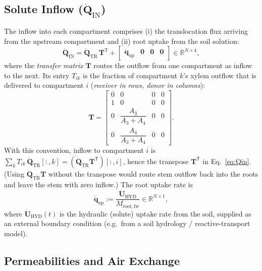 \documentclass[12pt,a4paper]{article}
\newcommand{\R}{\mathbb{R}}
\begin{document}
\subsection{Solute Inflow (\texorpdfstring{$\dot{\mathbf{Q}}_\mathrm{IN}$}{Q\_IN})}\label{sec:inflow}

The inflow into each compartment comprises (i) the translocation flux arriving from the upstream compartment and (ii) root uptake from the soil solution:
\begin{equation}\label{eq:Qin}
    \dot{\mathbf Q}_\mathrm{IN}
=
\dot{\mathbf Q}_\mathrm{TR}\,\mathbf T^{\mathsf T}
+
\begin{bmatrix}
\dot{\mathbf q}_\mathrm{up} & \mathbf 0 & \mathbf 0 & \mathbf 0
\end{bmatrix}
\in \R^{N\times4},
\end{equation}
where the \emph{transfer matrix} $\mathbf{T}$ routes the outflow from one compartment as inflow to the next.  Its entry $T_{ik}$ is the fraction of compartment $k$'s xylem outflow that is delivered to compartment $i$ (\emph{receiver in rows, donor in columns}):
\begin{equation}\label{eq:T}
    \mathbf T
=
\begin{bmatrix}
0 & 0 & 0 & 0 \\[2pt]
1 & 0 & 0 & 0 \\[2pt]
0 & \dfrac{A_3}{A_3 + A_4} & 0 & 0 \\[6pt]
0 & \dfrac{A_4}{A_3 + A_4} & 0 & 0
\end{bmatrix}.
\end{equation}
With this convention, inflow to compartment $i$ is $\sum_k T_{ik}\,\dot{\mathbf Q}_\mathrm{TR}[:,k] = (\dot{\mathbf Q}_\mathrm{TR}\mathbf T^{\mathsf T})[:,i]$, hence the transpose $\mathbf T^{\mathsf T}$ in Eq.~\eqref{eq:Qin}.  (Using $\dot{\mathbf Q}_\mathrm{TR}\mathbf T$ without the transpose would route stem outflow back into the roots and leave the stem with zero inflow.)  The root uptake rate is
\begin{equation*}
    \dot{\mathbf q}_\mathrm{up}
:=
\frac{\dot{\mathbf U}_\mathrm{HYD}}{M_{\mathrm{root,fw}}}
\in \R^{N\times1},
\end{equation*}
where $\dot{\mathbf{U}}_\mathrm{HYD}(t)$ is the hydraulic (solute) uptake rate from the soil, supplied as an external boundary condition (e.g.\ from a soil hydrology / reactive-transport model).


\subsection{Permeabilities and Air Exchange}\label{sec:permeability}
\end{document}

